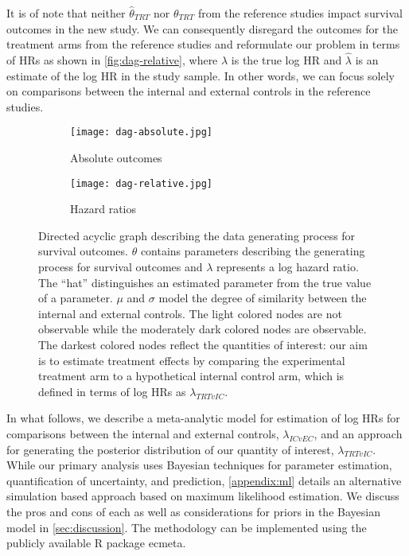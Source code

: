 \documentclass[11pt,final,fleqn]{article}\usepackage[]{graphicx}\usepackage[]{color}
\newcommand{\pkg}[1]{{\fontseries{m}\fontseries{b}\selectfont #1}}
\begin{document}
It is of note that neither $\hat{\theta}_{\textit{TRT}}$ nor $\theta_{\textit{TRT}}$ from the reference studies impact survival outcomes in the new study. We can consequently disregard the outcomes for the treatment arms from the reference studies and reformulate our problem in terms of HRs as shown in \autoref{fig:dag-relative}, where $\lambda$ is the true log HR and $\hat{\lambda}$ is an estimate of the log HR in the study sample. In other words, we can focus solely on comparisons between the internal and external controls in the reference studies.

\begin{figure}[t!]
\centering
\begin{subfigure}[b]{\textwidth}
\texttt{[image: dag-absolute.jpg]} 
\caption{Absolute outcomes} \label{fig:dag-absolute}
\end{subfigure}
\begin{subfigure}[b]{\textwidth}
\texttt{[image: dag-relative.jpg]} 
\caption{Hazard ratios} \label{fig:dag-relative}
\end{subfigure}
\caption{Directed acyclic graph describing the data generating process for survival outcomes. $\theta$ contains parameters describing the generating process for survival outcomes and $\lambda$ represents a log hazard ratio. The ``hat'' distinguishes an estimated parameter from the true value of a parameter. $\mu$ and $\sigma$ model the degree of similarity between the internal and external controls. The light colored nodes are not observable while the moderately dark colored nodes are observable. The darkest colored nodes reflect the quantities of interest: our aim is to estimate treatment effects by comparing the experimental treatment arm to a hypothetical internal control arm, which is defined in terms of log HRs as $\lambda_{TRTvIC}$.}
\label{fig:dag}
\end{figure}

In what follows, we describe a meta-analytic model for estimation of log HRs for comparisons between the internal and external controls, $\lambda_{ICvEC}$, and an approach for generating the posterior distribution of our quantity of interest, $\lambda_{\textit{TRT}vIC}$. While our primary analysis uses Bayesian techniques for parameter estimation, quantification of uncertainty, and prediction, \autoref{appendix:ml} details an alternative simulation based approach based on maximum likelihood estimation. We discuss the pros and cons of each as well as considerations for priors in the Bayesian model in \autoref{sec:discussion}. The methodology can be implemented using the publicly available \textsf{R} package \pkg{ecmeta}.
\end{document}

